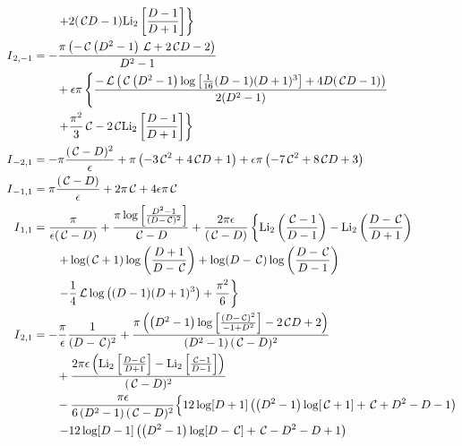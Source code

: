 \documentclass[prd,preprintnumbers,nofootinbib,superscriptaddress,onecolumn,preprint]{revtex4-1}
\newcommand\3[1]{\boldsymbol{#1}}
\newcommand{\cosfun}{\ensuremath{\mathcal{ \, C}}}
\newcommand{\llun}{\ensuremath{ \mathcal{\, L}}}
\begin{document}
\begin{align}
                 &{} \qquad \left. + 2 (\cosfun D-1) \text{Li}_2\left[\frac{D-1}{D+1}\right]\right\}  \\
I{}_{2,-1}   &{} = -\frac{\pi  \left(-\cosfun \left(D^2-1\right) \llun+2 \cosfun D-2\right)}{D^2-1} \nonumber \\
                 &{} \qquad + \epsilon \pi \left\{ \frac{-\llun \left(\cosfun \left(D^2-1\right) \log \left[\frac{1}{16} (D-1) (D+1)^3\right]
                 +4 D (\cosfun D-1)\right)}{2 (D^2-1)} \right. \nonumber \\ 
                 &{} \left. \qquad + \frac{\pi ^2}{3} \cosfun  -2 \cosfun \text{Li}_2\left[\frac{D-1}{D+1}\right] \right\}  \\
I{}_{-2,1}   &{}= -\pi \frac{(\cosfun-D)^2}{\epsilon } + \pi \left(-3 \cosfun^2+4  \cosfun D+1 \right) +  \epsilon \pi \left(-7 \cosfun^2+8 \cosfun D+3 \right) \\
I{}_{-1,1}   &{}= \pi \frac{(\cosfun - D)}{\epsilon } + 2 \pi \cosfun +  4 \epsilon  \pi \cosfun  \\
I{}_{1,1}   &{} = \frac{\pi }{\epsilon  (\cosfun-D)} + \frac{\pi  \log \left[\frac{D^2-1}{(D-\cosfun)^2}\right]}{\cosfun-D} 
                      + \frac{2 \pi \epsilon}{(\cosfun-D)} \left\{\text{Li}_2\left(\frac{\cosfun-1}{D-1}\right)-\text{Li}_2\left(\frac{D-\cosfun}{D+1}\right) \right. \nonumber \\ 
                &{} \qquad \left. + \log (\cosfun+1) \log \left(\frac{D+1}{D-\cosfun}\right)+\log (D-\cosfun) \log \left(\frac{D-\cosfun}{D-1}\right) \right. \nonumber \\
                &{} \qquad \left. - \frac{1}{4} \llun \log \left((D-1) (D+1)^3\right)+ \frac{\pi^2}{6} \right\} \\
	       I{}_{2,1}
&{} = -\frac{\pi }{\epsilon }\frac{1}{(D-\cosfun)^2} 
+\frac{\pi  \left(\left(D^2-1\right) \log \left[\frac{(D-\cosfun)^2}{-1+D^2}\right]-2 \cosfun D+2\right)}{\left(D^2-1\right) (\cosfun-D)^2} \nonumber \\
&{} \qquad + \frac{2 \pi  \epsilon  \left(\text{Li}_2\left[\frac{D-\cosfun}{D+1}\right]-\text{Li}_2\left[\frac{\cosfun-1}{D-1}\right]\right)}{(\cosfun-D)^2} \nonumber \\
&{} \qquad-\frac{\pi  \epsilon}{6 \left(D^2-1\right) (\cosfun-D)^2}  \Bigl\{12 \log [D+1] \left(\left(D^2-1\right) \log [\cosfun+1]+\cosfun+D^2-D-1\right) \nonumber \\ 
&{} \qquad\left. -12 \log [D-1] \left(\left(D^2-1\right) \log [D-\cosfun]+\cosfun-D^2-D+1\right) \right. \nonumber \\

\end{align}
\end{document}

